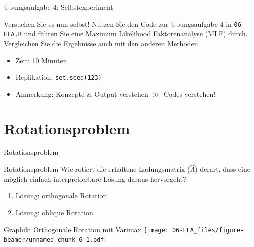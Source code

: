 \documentclass[
  ignorenonframetext,
]{beamer}
\providecommand{\tightlist}{%
  \setlength{\itemsep}{0pt}\setlength{\parskip}{0pt}}
\begin{document}
\begin{frame}{Übungsaufgabe 4: Selbstexperiment}
\protect\hypertarget{uxfcbungsaufgabe-4-selbstexperiment}{}
\begin{example}
Versuchen Sie es nun selbst! Nutzen Sie den Code zur Übungsaufgabe 4 in
\texttt{06-EFA.R} und führen Sie eine Maximum Likelihood Faktorenanalyse (MLF)
durch. Vergleichen Sie die Ergebnisse auch mit den anderen Methoden.
\end{example}

\begin{itemize}
\tightlist
\item
  Zeit: 10 Minuten
\item
  Replikation: \texttt{set.seed(123)}
\item
  Anmerkung: Konzepte \& Output verstehen \(\gg\) Codes verstehen!
\end{itemize}
\end{frame}

\hypertarget{rotationsproblem}{%
\section{Rotationsproblem}\label{rotationsproblem}}

\begin{frame}{Rotationsproblem}
\begin{alertblock}{Rotationsproblem}
  Wie rotiert die erhaltene Ladungsmatrix ($\hat\Lambda$) derart, dass eine
  möglich einfach interpretierbare Lösung daraus hervorgeht?
\end{alertblock}

\begin{enumerate}
\tightlist
\item
  Lösung: orthogonale Rotation
\item
  Lösung: oblique Rotation
\end{enumerate}
\end{frame}

\begin{frame}{Graphik: Orthogonale Rotation mit Varimax}
\protect\hypertarget{graphik-orthogonale-rotation-mit-varimax}{}
\texttt{[image: 06-EFA\_files/figure-beamer/unnamed-chunk-6-1.pdf]}
\end{frame}
\end{document}
